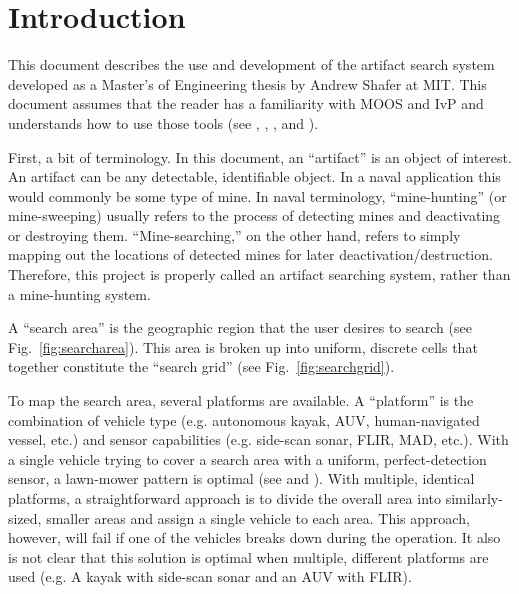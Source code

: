 \section{Introduction}
\label{intro}

This document describes the use and development of the artifact search system developed as a Master's of Engineering thesis by Andrew Shafer at MIT.  This document assumes that the reader has a familiarity with MOOS and IvP and understands how to use those tools (see \cite{new03}, \cite{ben02a}, \cite{ben03}, and \cite{ben04b}).

First, a bit of terminology.  In this document, an ``artifact'' is an object of interest.  An artifact can be any detectable, identifiable object.  In a naval application this would commonly be some type of mine.  In naval terminology, ``mine-hunting'' (or mine-sweeping) usually refers to the process of detecting mines and deactivating or destroying them.  ``Mine-searching,'' on the other hand, refers to simply mapping out the locations of detected mines for later deactivation/destruction.  Therefore, this project is properly called an artifact searching system, rather than a mine-hunting system.

A ``search area'' is the geographic region that the user desires to search (see Fig.~\ref{fig:searcharea}).  This area is broken up into uniform, discrete cells that together constitute the ``search grid'' (see Fig.~\ref{fig:searchgrid}).



To map the search area, several platforms are available.  A ``platform'' is the combination of vehicle type (e.g. autonomous kayak, AUV, human-navigated vessel, etc.) and sensor capabilities (e.g. side-scan sonar, FLIR, MAD, etc.).  With a single vehicle trying to cover a search area with a uniform, perfect-detection sensor, a lawn-mower pattern is optimal (see \cite{choset01} and \cite{choset03}).  With multiple, identical platforms, a straightforward approach is to divide the overall area into similarly-sized, smaller areas and assign a single vehicle to each area.  This approach, however, will fail if one of the vehicles breaks down during the operation.  It also is not clear that this solution is optimal when multiple, different platforms are used (e.g. A kayak with side-scan sonar and an AUV with FLIR).


